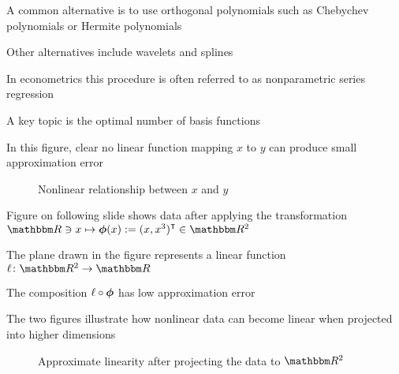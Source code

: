\begin{frame}

    \vspace{2em}
    \Eg
    A common alternative is to use orthogonal polynomials such as Chebychev
    polynomials or Hermite polynomials
    
    Other
    alternatives include wavelets and splines
    
    \vspace{.7em}
    In econometrics this procedure
    is often referred to as nonparametric series regression
    
    A key topic is the optimal number of basis functions
    
\end{frame}

\begin{frame}

    \vspace{2em}
    In this figure, clear no linear function mapping $x$ to $y$ 
    can produce small approximation error
     
    \begin{figure}
    \centering
    \caption{ Nonlinear relationship between $x$ and $y$}
    \end{figure}
    
\end{frame}

\begin{frame}

    \vspace{2em}
    Figure on following slide shows data after applying
    the transformation $\RR \ni x \mapsto \boldphi(x) := (x, x^3)^\T \in \RR^2$
    
    The
    plane drawn in the figure represents a linear function $\ell \colon
    \RR^2 \to \RR$
    
    \vspace{.7em}
    The composition $\ell \circ {\boldsymbol \phi}$ has low approximation
    error
    
    The two figures illustrate how nonlinear data can become linear when
    projected into higher dimensions
    
\end{frame}

\begin{frame}

    \begin{figure}
    \centering
    \caption{\label{f:lap3d} Approximate linearity after projecting the data to $\RR^2$}
    
\end{figure}

\end{frame}

